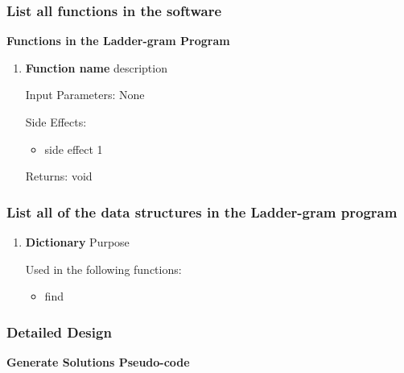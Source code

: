\documentclass[12pt, a4]{report}
\begin{document}
	\subsubsection{List all functions in the software}
	\textbf{	Functions in the Ladder-gram Program}
	\begin{enumerate}
		\item
			\textbf{Function name}
			\textbar{}  description
			\par Input Parameters: None
			\par Side Effects:
			\begin{itemize}
				\item side effect 1
			\end{itemize}
			\par Returns: void
	\end{enumerate}
	

	
	\subsubsection{List all of the data structures in the Ladder-gram program}
		\begin{enumerate}
				\item
					\textbf{Dictionary}
					\textbar{} Purpose
					\par Used in the following functions:
					\begin{itemize}
						\item find
					\end{itemize}
		\end{enumerate}
	

	\subsubsection{Detailed Design}
	
	
	\textbf{Generate Solutions Pseudo-code}
	

\end{document}
